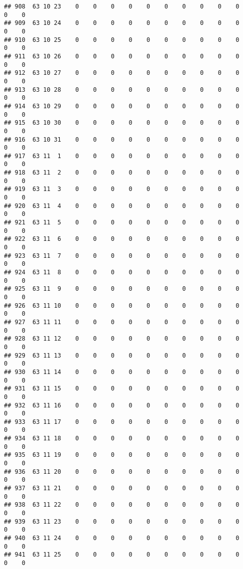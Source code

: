 \documentclass[]{article}
\begin{document}
\begin{verbatim}
## 908  63 10 23    0    0    0    0    0    0    0    0    0    0    0    0
## 909  63 10 24    0    0    0    0    0    0    0    0    0    0    0    0
## 910  63 10 25    0    0    0    0    0    0    0    0    0    0    0    0
## 911  63 10 26    0    0    0    0    0    0    0    0    0    0    0    0
## 912  63 10 27    0    0    0    0    0    0    0    0    0    0    0    0
## 913  63 10 28    0    0    0    0    0    0    0    0    0    0    0    0
## 914  63 10 29    0    0    0    0    0    0    0    0    0    0    0    0
## 915  63 10 30    0    0    0    0    0    0    0    0    0    0    0    0
## 916  63 10 31    0    0    0    0    0    0    0    0    0    0    0    0
## 917  63 11  1    0    0    0    0    0    0    0    0    0    0    0    0
## 918  63 11  2    0    0    0    0    0    0    0    0    0    0    0    0
## 919  63 11  3    0    0    0    0    0    0    0    0    0    0    0    0
## 920  63 11  4    0    0    0    0    0    0    0    0    0    0    0    0
## 921  63 11  5    0    0    0    0    0    0    0    0    0    0    0    0
## 922  63 11  6    0    0    0    0    0    0    0    0    0    0    0    0
## 923  63 11  7    0    0    0    0    0    0    0    0    0    0    0    0
## 924  63 11  8    0    0    0    0    0    0    0    0    0    0    0    0
## 925  63 11  9    0    0    0    0    0    0    0    0    0    0    0    0
## 926  63 11 10    0    0    0    0    0    0    0    0    0    0    0    0
## 927  63 11 11    0    0    0    0    0    0    0    0    0    0    0    0
## 928  63 11 12    0    0    0    0    0    0    0    0    0    0    0    0
## 929  63 11 13    0    0    0    0    0    0    0    0    0    0    0    0
## 930  63 11 14    0    0    0    0    0    0    0    0    0    0    0    0
## 931  63 11 15    0    0    0    0    0    0    0    0    0    0    0    0
## 932  63 11 16    0    0    0    0    0    0    0    0    0    0    0    0
## 933  63 11 17    0    0    0    0    0    0    0    0    0    0    0    0
## 934  63 11 18    0    0    0    0    0    0    0    0    0    0    0    0
## 935  63 11 19    0    0    0    0    0    0    0    0    0    0    0    0
## 936  63 11 20    0    0    0    0    0    0    0    0    0    0    0    0
## 937  63 11 21    0    0    0    0    0    0    0    0    0    0    0    0
## 938  63 11 22    0    0    0    0    0    0    0    0    0    0    0    0
## 939  63 11 23    0    0    0    0    0    0    0    0    0    0    0    0
## 940  63 11 24    0    0    0    0    0    0    0    0    0    0    0    0
## 941  63 11 25    0    0    0    0    0    0    0    0    0    0    0    0

\end{verbatim}
\end{document}

